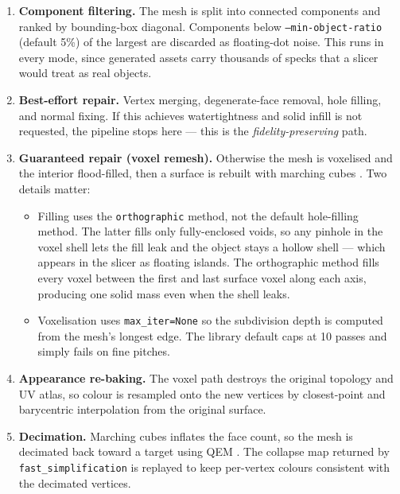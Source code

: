 \documentclass[11pt,a4paper]{article}
\begin{document}
\begin{enumerate}[leftmargin=*]
  \item \textbf{Component filtering.} The mesh is split into connected
        components and ranked by bounding-box diagonal. Components below
        \texttt{--min-object-ratio} (default 5\%) of the largest are discarded
        as floating-dot noise. This runs in every mode, since generated assets
        carry thousands of specks that a slicer would treat as real objects.
  \item \textbf{Best-effort repair.} Vertex merging, degenerate-face removal,
        hole filling, and normal fixing. If this achieves watertightness and
        solid infill is not requested, the pipeline stops here --- this is the
        \emph{fidelity-preserving} path.
  \item \textbf{Guaranteed repair (voxel remesh).} Otherwise the mesh is
        voxelised and the interior flood-filled, then a surface is rebuilt with
        marching cubes \cite{lorensen1987marchingcubes}. Two details matter:
        \begin{itemize}
          \item Filling uses the \texttt{orthographic} method, not the default
                hole-filling method. The latter fills only fully-enclosed
                voids, so any pinhole in the voxel shell lets the fill leak and
                the object stays a hollow shell --- which appears in the slicer
                as floating islands. The orthographic method fills every voxel
                between the first and last surface voxel along each axis,
                producing one solid mass even when the shell leaks.
          \item Voxelisation uses \texttt{max\_iter=None} so the subdivision
                depth is computed from the mesh's longest edge. The library
                default caps at 10 passes and simply fails on fine pitches.
        \end{itemize}
  \item \textbf{Appearance re-baking.} The voxel path destroys the original
        topology and UV atlas, so colour is resampled onto the new vertices by
        closest-point and barycentric interpolation from the original surface.
  \item \textbf{Decimation.} Marching cubes inflates the face count, so the
        mesh is decimated back toward a target using QEM \cite{garland1997qem}.
        The collapse map returned by \texttt{fast\_simplification} is replayed
        to keep per-vertex colours consistent with the decimated vertices.
\end{enumerate}
\end{document}
